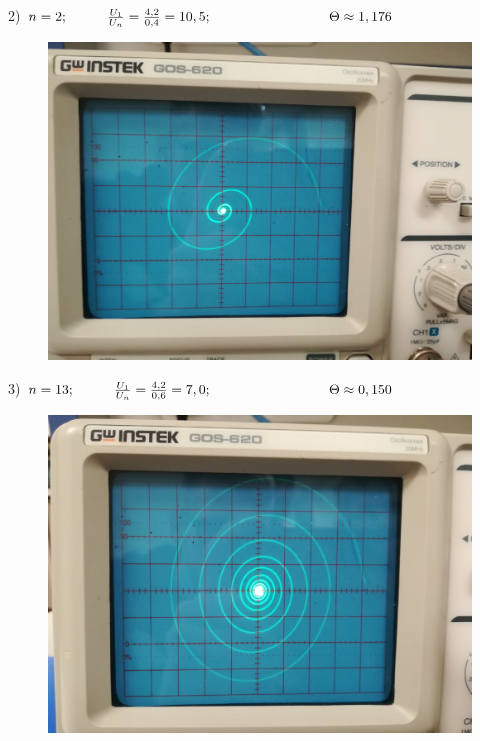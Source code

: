\documentclass[a4paper,12pt]{article} %
\begin{document}
\newpage

2) $n = 2; \hspace{10mm} \frac{U_1}{U_n} = \frac{4,2}{0,4} = 10,5; \hspace{30mm} \Theta \approx 1,176$

\begin{figure}[h!]
	\centering
	\includegraphics[scale=0.22]{Pictures/2.jpg}
\end{figure}

\vspace{15mm}

3) $n = 13; \hspace{10mm} \frac{U_1}{U_n} = \frac{4,2}{0,6} = 7,0; \hspace{30mm} \Theta \approx 0,150$

\begin{figure}[h!]
	\centering
	\includegraphics[scale=0.22]{Pictures/3.jpg}
\end{figure}
\end{document}
